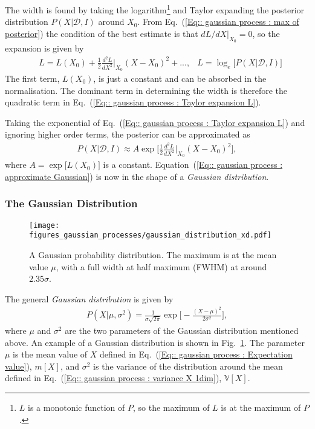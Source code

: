 \documentclass[twoside,english]{uiofysmaster}
\begin{document}
{{The width is found by taking the logarithm\footnote{$L$ is a monotonic function of $P$, so the maximum of $L$ is at the maximum of $P$.} and Taylor expanding the posterior distribution $P(X| \mathcal{D}, I)$ around $X_0$. From Eq.~(\ref{Eq:: gaussian process : max of posterior}) the condition of the best estimate is that $dL/dX|_{X_0} =0$, so the expansion is given by
\begin{align}
&L = L(X_0) + \frac{1}{2} \frac{d^2L}{dX^2}\Big|_{X_0} (X-X_0)^2 +... ,&L = \log_e \Big[P(X | \mathcal{D}, I ) \Big]\label{Eq:: gaussian process : Taylor expansion L}
\end{align}
The first term, $L(X_0)$, is just a constant and can be absorbed in the normalisation. The dominant term in determining the width is therefore the quadratic term in Eq.~(\ref{Eq:: gaussian process : Taylor expansion L}).

Taking the exponential of Eq.~(\ref{Eq:: gaussian process : Taylor expansion L}) and ignoring higher order terms, the posterior can be approximated as
\begin{align}\label{Eq:: gaussian process : approximate Gaussian}
P(X | \mathcal{D}, I) \approx A \exp \Bigg[ \frac{1}{2} \frac{d^2L}{dX^2}\Big|_{X_0} (X-X_0)^2 \Bigg], 
\end{align} 
where $A = \exp \big[L(X_0) \big]$ is a constant. Equation~(\ref{Eq:: gaussian process : approximate Gaussian}) is now in the shape of a \textit{Gaussian distribution}.


\subsubsection{The Gaussian Distribution}\label{Sec:: gaussian process : The Gaussian Distribution}

\begin{figure}
\centering
\texttt{[image: figures\_gaussian\_processes/gaussian\_distribution\_xd.pdf]}
\caption{A Gaussian probability distribution. The maximum is at the mean value $\mu$, with a full width at half maximum (FWHM) at around $2.35 \sigma$. }
\label{Fig:: gaussian process : Gaussian distribution}
\end{figure}

The general \textit{Gaussian distribution} is given by
\begin{align}
P(X| \mu, \sigma^2) = \frac{1}{\sigma \sqrt{2 \pi}} \exp \Bigg[ - \frac{(X- \mu)^2}{2 \sigma^2} \Bigg],
\end{align}
where $\mu$ and $\sigma^2$ are the two parameters of the Gaussian distribution mentioned above. An example of a Gaussian distribution is shown in Fig.~\ref{Fig:: gaussian process : Gaussian distribution}. The parameter $\mu$ is the mean value of $X$ defined in Eq.~(\ref{Eq:: gaussian process : Expectation value}), $ m[X]$, and $\sigma^2$ is the variance of the distribution around the mean defined in Eq.~(\ref{Eq:: gaussian process : variance X 1dim}), $\mathbb{V}[X]$.  

}}
\end{document}

